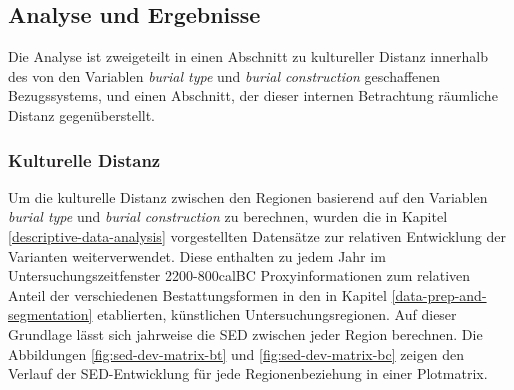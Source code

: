 \documentclass[openany,twoside,twocolumn]{book}
\begin{document}
\hypertarget{analyse-und-ergebnisse}{%
\subsection{Analyse und Ergebnisse}\label{analyse-und-ergebnisse}}

Die Analyse ist zweigeteilt in einen Abschnitt zu kultureller Distanz innerhalb des von den Variablen \emph{burial type} und \emph{burial construction} geschaffenen Bezugssystems, und einen Abschnitt, der dieser internen Betrachtung räumliche Distanz gegenüberstellt.

\hypertarget{kulturelle-distanz}{%
\subsubsection{Kulturelle Distanz}\label{kulturelle-distanz}}

Um die kulturelle Distanz zwischen den Regionen basierend auf den Variablen \emph{burial type} und \emph{burial construction} zu berechnen, wurden die in Kapitel \ref{descriptive-data-analysis} vorgestellten Datensätze zur relativen Entwicklung der Varianten weiterverwendet. Diese enthalten zu jedem Jahr im Untersuchungszeitfenster 2200-800calBC Proxyinformationen zum relativen Anteil der verschiedenen Bestattungsformen in den in Kapitel \ref{data-prep-and-segmentation} etablierten, künstlichen Untersuchungsregionen. Auf dieser Grundlage lässt sich jahrweise die SED zwischen jeder Region berechnen. Die Abbildungen \ref{fig:sed-dev-matrix-bt} und \ref{fig:sed-dev-matrix-bc} zeigen den Verlauf der SED-Entwicklung für jede Regionenbeziehung in einer Plotmatrix.
\end{document}
